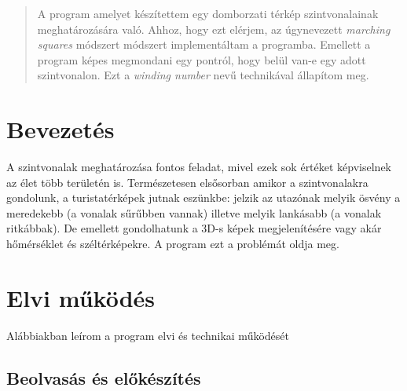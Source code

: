 \documentclass[a4paper, 12pt]{article}
\numberwithin{equation}{section}          %
\numberwithin{figure}{subsection}
\begin{document}
\newpage



\thispagestyle{empty}  

\begin{abstract}
  A program amelyet készítettem egy domborzati térkép szintvonalainak meghatározására való. Ahhoz, hogy ezt elérjem, az úgynevezett \textit{marching squares} módszert módszert implementáltam a programba. Emellett a program képes megmondani egy pontról, hogy belül van-e egy adott szintvonalon. Ezt a \textit{winding number} nevű technikával állapítom meg.


\end{abstract}


\newpage \vspace*{2cm}
\thispagestyle{plain}                                                                                                                                             
 \setcounter{page}{1}
\tableofcontents

\newpage \vspace*{2cm}
\thispagestyle{plain}
\listoffigures
\endLOFtrue

\newpage \vspace*{2cm}

 \setcounter{page}{1}
\pagestyle{empty}



\section{Bevezetés}
\label{sec:bev}
A szintvonalak meghatározása fontos feladat, mivel ezek sok értéket képviselnek az élet több területén is. Természetesen elsősorban amikor a szintvonalakra gondolunk, a turistatérképek jutnak eszünkbe: jelzik az utazónak melyik ösvény a meredekebb (a vonalak sűrűbben vannak) illetve melyik lankásabb (a vonalak ritkábbak). De emellett gondolhatunk a 3D-s képek megjelenítésére vagy akár hőmérséklet és széltérképekre. A program ezt a problémát oldja meg. 


\section{Elvi működés}
\label{sec:fejezet}

Alábbiakban leírom a program elvi és technikai működését
\subsection{Beolvasás és előkészítés}
\label{subsec:alfejezet}
\end{document}
